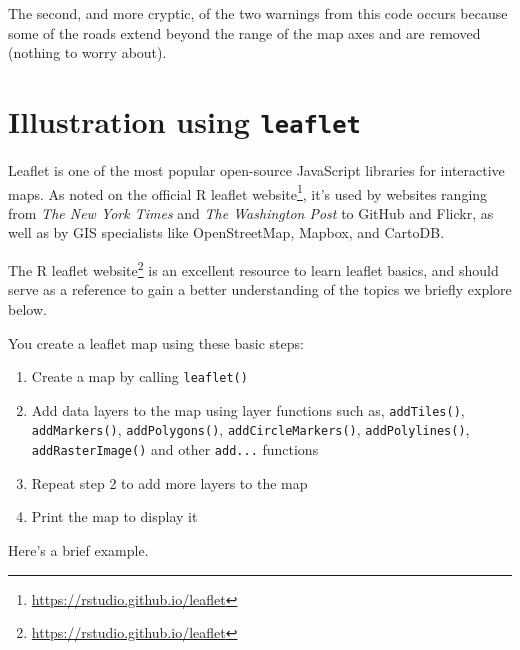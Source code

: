 \documentclass[]{krantz}
\makeatletter
\newenvironment{Shaded}{\begin{snugshade}}{\end{snugshade}}
\newcommand{\KeywordTok}[1]{\textcolor[rgb]{0.27,0.27,0.27}{\textbf{#1}}}
\newcommand{\DataTypeTok}[1]{\textcolor[rgb]{0.27,0.27,0.27}{#1}}
\newcommand{\FloatTok}[1]{\textcolor[rgb]{0.06,0.06,0.06}{#1}}
\newcommand{\StringTok}[1]{\textcolor[rgb]{0.5,0.5,0.5}{#1}}
\newcommand{\CommentTok}[1]{\textcolor[rgb]{0.37,0.37,0.37}{\textit{#1}}}
\newcommand{\OperatorTok}[1]{\textcolor[rgb]{0.43,0.43,0.43}{\textbf{#1}}}
\newcommand{\ErrorTok}[1]{\textcolor[rgb]{0.14,0.14,0.14}{\textbf{#1}}}
\newcommand{\NormalTok}[1]{#1}
\providecommand{\tightlist}{%
  \setlength{\itemsep}{0pt}\setlength{\parskip}{0pt}}
\renewcommand{\href}[2]{#2\footnote{\url{#1}}}
\newenvironment{kframe}{%
\medskip{}
\setlength{\fboxsep}{.8em}
 \def\at@end@of@kframe{}%
 \ifinner\ifhmode%
  \def\at@end@of@kframe{\end{minipage}}%
  \begin{minipage}{\columnwidth}%
 \fi\fi%
 \def\FrameCommand##1{\hskip\@totalleftmargin \hskip-\fboxsep
 \colorbox{shadecolor}{##1}\hskip-\fboxsep
     \hskip-\linewidth \hskip-\@totalleftmargin \hskip\columnwidth}%
 \MakeFramed {\advance\hsize-\width
   \@totalleftmargin\z@ \linewidth\hsize
   \@setminipage}}%
 {\par\unskip\endMakeFramed%
 \at@end@of@kframe}
\renewenvironment{Shaded}{\begin{kframe}}{\end{kframe}}
\makeatother
\begin{document}
The second, and more cryptic, of the two warnings from this code occurs
because some of the roads extend beyond the range of the map axes and
are removed (nothing to worry about).

\section{\texorpdfstring{Illustration using
\texttt{leaflet}}{Illustration using leaflet}}\label{illustration-using-leaflet}

Leaflet is one of the most popular open-source JavaScript libraries for
interactive maps. As noted on the official
\href{https://rstudio.github.io/leaflet}{R leaflet website}, it's used
by websites ranging from \emph{The New York Times} and \emph{The
Washington Post} to GitHub and Flickr, as well as by GIS specialists
like OpenStreetMap, Mapbox, and CartoDB.

The \href{https://rstudio.github.io/leaflet}{R leaflet website} is an
excellent resource to learn leaflet basics, and should serve as a
reference to gain a better understanding of the topics we briefly
explore below.

You create a leaflet map using these basic steps:

\begin{enumerate}
\def\labelenumi{\arabic{enumi}.}
\tightlist
\item
  Create a map by calling \texttt{leaflet()}
\item
  Add data layers to the map using layer functions such as,
  \texttt{addTiles()}, \texttt{addMarkers()}, \texttt{addPolygons()},
  \texttt{addCircleMarkers()}, \texttt{addPolylines()},
  \texttt{addRasterImage()} and other \texttt{add...} functions
\item
  Repeat step 2 to add more layers to the map
\item
  Print the map to display it
\end{enumerate}

Here's a brief example.

\begin{Shaded}
\end{Shaded}
\end{document}

